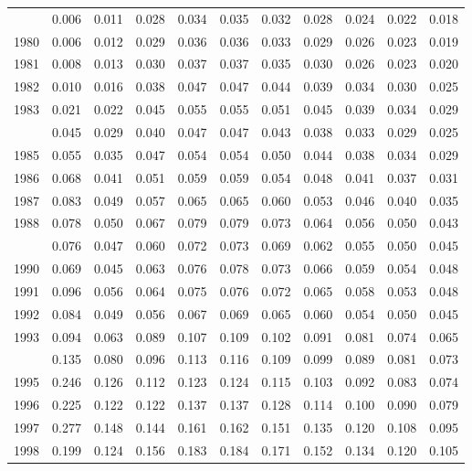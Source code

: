 \documentclass[
]{article}
\begin{document}
\begin{longtable}[t]{lrrrrrrrrrr}
\endfoot
\bottomrule
\endlastfoot
1979 & 0.006 & 0.011 & 0.028 & 0.034 & 0.035 & 0.032 & 0.028 & 0.024 & 0.022 & 0.018\\
1980 & 0.006 & 0.012 & 0.029 & 0.036 & 0.036 & 0.033 & 0.029 & 0.026 & 0.023 & 0.019\\
1981 & 0.008 & 0.013 & 0.030 & 0.037 & 0.037 & 0.035 & 0.030 & 0.026 & 0.023 & 0.020\\
1982 & 0.010 & 0.016 & 0.038 & 0.047 & 0.047 & 0.044 & 0.039 & 0.034 & 0.030 & 0.025\\
1983 & 0.021 & 0.022 & 0.045 & 0.055 & 0.055 & 0.051 & 0.045 & 0.039 & 0.034 & 0.029\\
\addlinespace
1984 & 0.045 & 0.029 & 0.040 & 0.047 & 0.047 & 0.043 & 0.038 & 0.033 & 0.029 & 0.025\\
1985 & 0.055 & 0.035 & 0.047 & 0.054 & 0.054 & 0.050 & 0.044 & 0.038 & 0.034 & 0.029\\
1986 & 0.068 & 0.041 & 0.051 & 0.059 & 0.059 & 0.054 & 0.048 & 0.041 & 0.037 & 0.031\\
1987 & 0.083 & 0.049 & 0.057 & 0.065 & 0.065 & 0.060 & 0.053 & 0.046 & 0.040 & 0.035\\
1988 & 0.078 & 0.050 & 0.067 & 0.079 & 0.079 & 0.073 & 0.064 & 0.056 & 0.050 & 0.043\\
\addlinespace
1989 & 0.076 & 0.047 & 0.060 & 0.072 & 0.073 & 0.069 & 0.062 & 0.055 & 0.050 & 0.045\\
1990 & 0.069 & 0.045 & 0.063 & 0.076 & 0.078 & 0.073 & 0.066 & 0.059 & 0.054 & 0.048\\
1991 & 0.096 & 0.056 & 0.064 & 0.075 & 0.076 & 0.072 & 0.065 & 0.058 & 0.053 & 0.048\\
1992 & 0.084 & 0.049 & 0.056 & 0.067 & 0.069 & 0.065 & 0.060 & 0.054 & 0.050 & 0.045\\
1993 & 0.094 & 0.063 & 0.089 & 0.107 & 0.109 & 0.102 & 0.091 & 0.081 & 0.074 & 0.065\\
\addlinespace
1994 & 0.135 & 0.080 & 0.096 & 0.113 & 0.116 & 0.109 & 0.099 & 0.089 & 0.081 & 0.073\\
1995 & 0.246 & 0.126 & 0.112 & 0.123 & 0.124 & 0.115 & 0.103 & 0.092 & 0.083 & 0.074\\
1996 & 0.225 & 0.122 & 0.122 & 0.137 & 0.137 & 0.128 & 0.114 & 0.100 & 0.090 & 0.079\\
1997 & 0.277 & 0.148 & 0.144 & 0.161 & 0.162 & 0.151 & 0.135 & 0.120 & 0.108 & 0.095\\
1998 & 0.199 & 0.124 & 0.156 & 0.183 & 0.184 & 0.171 & 0.152 & 0.134 & 0.120 & 0.105\\

\end{longtable}
\end{document}
